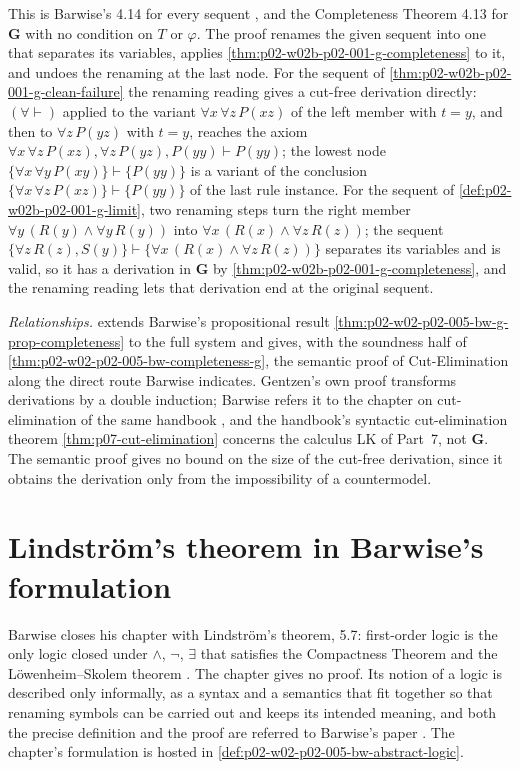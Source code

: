 This is Barwise's 4.14 for every sequent
\cite[ch.~A.1, \S4, p.~40]{Barwise1977FirstOrder}, and the Completeness
Theorem 4.13 for \(\mathbf G\) with no condition on \(T\) or \(\varphi\).
The proof renames the given sequent into one that separates its variables,
applies \cref{thm:p02-w02b-p02-001-g-completeness} to it, and undoes the
renaming at the last node.  For the sequent of
\cref{thm:p02-w02b-p02-001-g-clean-failure} the renaming reading gives a
cut-free derivation directly: \((\forall\vdash)\) applied to the variant
\(\forall x\,\forall z\,P(xz)\) of the left member with \(t=y\), and then to
\(\forall z\,P(yz)\) with \(t=y\), reaches the axiom
\(\forall x\,\forall z\,P(xz),\forall z\,P(yz),P(yy)\vdash P(yy)\); the
lowest node \(\{\forall x\,\forall y\,P(xy)\}\vdash\{P(yy)\}\) is a variant
of the conclusion \(\{\forall x\,\forall z\,P(xz)\}\vdash\{P(yy)\}\) of the
last rule instance.  For the sequent of
\cref{def:p02-w02b-p02-001-g-limit}, two renaming steps turn the right
member \(\forall y\,(R(y)\land\forall y\,R(y))\) into
\(\forall x\,(R(x)\land\forall z\,R(z))\); the sequent
\(\{\forall z\,R(z),S(y)\}\vdash\{\forall x\,(R(x)\land\forall z\,R(z))\}\)
separates its variables and is valid, so it has a derivation in
\(\mathbf G\) by \cref{thm:p02-w02b-p02-001-g-completeness}, and the
renaming reading lets that derivation end at the original sequent.

\emph{Relationships.}   extends
Barwise's propositional result
\cref{thm:p02-w02-p02-005-bw-g-prop-completeness} to the full system and
gives, with the soundness half of
\cref{thm:p02-w02-p02-005-bw-completeness-g}, the semantic proof of
Cut-Elimination along the direct route Barwise indicates.  Gentzen's own
proof transforms derivations by a double induction; Barwise refers it to
the chapter on cut-elimination of the same handbook
\cite[ch.~A.1, \S4, p.~40]{Barwise1977FirstOrder}, and the handbook's
syntactic cut-elimination theorem \cref{thm:p07-cut-elimination} concerns
the calculus LK of Part~7, not \(\mathbf G\).  The semantic proof gives no
bound on the size of the cut-free derivation, since it obtains the
derivation only from the impossibility of a countermodel.

\section{Lindstr\"om's theorem in Barwise's formulation}
\label{sec:p02-w02b-p02-001-lindstrom}

Barwise closes his chapter with Lindstr\"om's theorem, 5.7: first-order
logic is the only logic closed under \(\land\), \(\neg\), \(\exists\) that
satisfies the Compactness Theorem and the L\"owenheim--Skolem theorem
\cite[ch.~A.1, \S5, 5.7, p.~45]{Barwise1977FirstOrder}.  The chapter gives
no proof.  Its notion of a logic is described only informally, as a syntax
and a semantics that fit together so that renaming symbols can be carried
out and keeps its intended meaning, and both the precise definition and the
proof are referred to Barwise's paper \cite{Barwise1974Axioms}
\cite[ch.~A.1, \S5, 5.6, p.~45]{Barwise1977FirstOrder}.  The chapter's
formulation is hosted in \cref{def:p02-w02-p02-005-bw-abstract-logic}.

